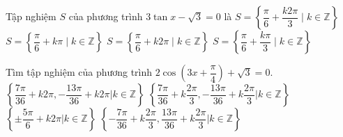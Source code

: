 \begin{ex}%
	Tập nghiệm $S$ của phương  trình $3\tan x-\sqrt{3}=0$ là
	 \choice
		{$S=\left\{\dfrac{\pi}{6}+\dfrac{k2\pi}{3}\mid k\in  \mathbb{Z}\right\}$}
		{\True $S=\left\{\dfrac{\pi}{6}+k\pi\mid k\in \mathbb{Z}\right\}$} 
		{$S=\left\{\dfrac{\pi}{6}+k2\pi\mid  k\in \mathbb{Z}\right\}$}
		{$S=\left\{\dfrac{\pi}{6}+\dfrac{k\pi}{3}\mid k\in  \mathbb{Z}\right\}$}
\end{ex}

\begin{ex}%
	Tìm tập nghiệm của  phương trình $2 \cos \left( 3x+\dfrac{\pi}{4} \right) +\sqrt{3}=0$.
	 \choice
		{$\left\lbrace \dfrac{7\pi}{36} + k 2\pi , -\dfrac{13\pi}{36}+k 2 \pi | k \in  \mathbb{Z} \right\rbrace $}
		{\True $\left\lbrace \dfrac{7\pi}{36} + k\dfrac{2\pi}{3}, - \dfrac{13\pi}{36}+k\dfrac{2\pi}{3} | k \in \mathbb{Z} \right\rbrace $} 
		{$\left\lbrace \pm \dfrac{5\pi}{6} + k 2\pi| k \in \mathbb{Z}  \right\rbrace $}
		{$\left\lbrace - \dfrac{7\pi}{36} + k\dfrac{2\pi}{3}, \dfrac{13\pi}{36}+k\dfrac{2\pi}{3}  | k \in \mathbb{Z} \right\rbrace $}
\end{ex}

